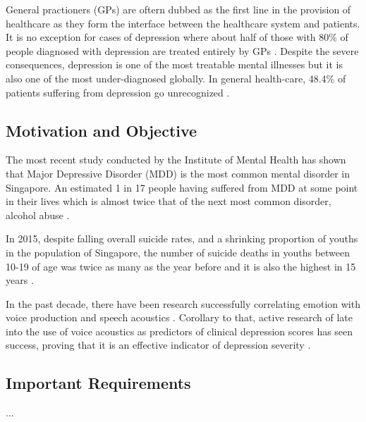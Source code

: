 \documentclass{article}
\begin{document}
	General practioners (GPs) are oftern dubbed as the first line in the provision of healthcare as they form the interface between the healthcare system and patients. It is no exception for cases of depression where about half of those with 80\% of people diagnosed with depression are treated entirely by GPs \cite{goldbergd1994}. 
	Despite the severe consequences, depression is one of the most treatable mental illnesses but it is also one of the most under-diagnosed globally. 
	In general health-care, 48.4\% of patients suffering from depression go unrecognized \cite{jama2003}.

	\subsection{Motivation and Objective}
	The most recent study conducted by the Institute of Mental Health has shown that Major Depressive Disorder (MDD) is the most common mental disorder in Singapore. An estimated 1 in 17 people having suffered from MDD at some point in their lives which is almost twice that of the next most common disorder, alcohol abuse \cite{annacadmedsg}.

	In 2015, despite falling overall suicide rates, and a shrinking proportion of youths in the population of Singapore, the number of suicide deaths in youths between 10-19 of age was twice as many as the year before and it is also the highest in 15 years \cite{samaritansofsingapore2016}.
	
	In the past decade, there have been research successfully correlating emotion with voice production and speech acoustics \cite{uwa2001}. 
	Corollary to that, active research of late into the use of voice acoustics as predictors of clinical depression scores has seen success, proving that it is an effective indicator of depression severity \cite{jov2016}.\\
	
	\subsection{Important Requirements}
	...
	
\end{document}
